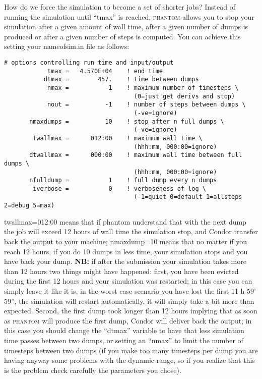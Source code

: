 \documentclass[10pt,a4paper,twoside]{article} %
\begin{document}
How do we force the simulation to become a set of shorter jobs? Instead of running the simulation until ``tmax'' is reached, \textsc{phantom} allows you to stop your simulation after a given amount of wall time, after a given number of dumps is produced or after a given number of steps is computed. You can achieve this setting your nameofsim.in file as follows:
\begin{verbatim}
# options controlling run time and input/output
            tmax =   4.570E+04    ! end time
           dtmax =        457.    ! time between dumps
            nmax =          -1    ! maximum number of timesteps \
                                    (0=just get derivs and stop)
            nout =          -1    ! number of steps between dumps \
                                    (-ve=ignore)
       nmaxdumps =          10    ! stop after n full dumps \
                                    (-ve=ignore)
        twallmax =      012:00    ! maximum wall time \
                                    (hhh:mm, 000:00=ignore)
       dtwallmax =      000:00    ! maximum wall time between full dumps \
                                    (hhh:mm, 000:00=ignore)
       nfulldump =           1    ! full dump every n dumps
        iverbose =           0    ! verboseness of log \
                                    (-1=quiet 0=default 1=allsteps 2=debug 5=max)
\end{verbatim} 
twallmax=012:00 means that if phantom understand that with the next dump the job will exceed 12 hours of wall time the simulation stop, and Condor transfer back the output to your machine; nmaxdump=10 means that no matter if you reach 12 hours, if you do 10 dumps in less time, your simulation stops and you have back your dump. \textbf{NB:} if after the submission your simulation takes more than 12 hours two things might have happened: first, you have been evicted during the first 12 hours and your simulation was restarted; in this case you can simply leave it like it is, in the worst case scenario you have lost the first 11 h 59' 59'', the simulation will restart automatically, it will simply take a bit more than expected. Second, the first dump took longer than 12 hours implying that as soon as \textsc{phantom} will produce the first dump, Condor will deliver back the output; in this case you should change the ``dtmax'' variable to have that less simulation time passes between two dumps, or setting an ``nmax'' to limit the number of timesteps between two dumps (if you make too many timesteps per dump you are having anyway some problems with the dynamic range, so if you realize that this is the problem check carefully the parameters you chose).
\end{document}
